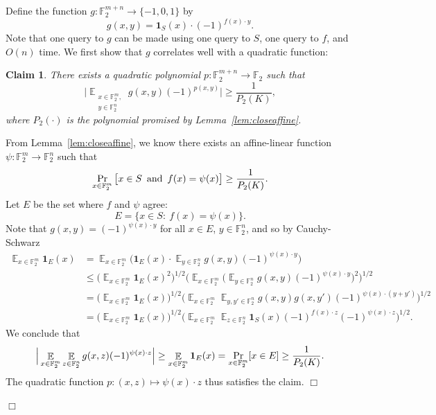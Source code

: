 \documentclass[11pt]{amsart}
\renewcommand{\Pr}{\mathop{\mbox{\rm Pr}}}
\newcommand{\Exp}{\mathop{\mathbb{E}}}
\newcommand{\F}{\mathbb{F}} %
\newcommand{\one}{\mathbf{1}}
\theoremstyle{plain}
\newtheorem{claim}[theorem]{Claim}
\theoremstyle{definition}
\theoremstyle{remark}
\renewenvironment{proof}[1][]{
    	\begin{trivlist}
     	\item[\hspace{\labelsep}{\em\noindent Proof#1:\/}]}
     	{{\hfill$\Box$}
    	\end{trivlist}
  }
\begin{document}
\begin{proof}
Define the function $g: \F_2^{m+n} \to \{-1, 0, 1\}$ by
$$g(x, y) = \one_S(x)\cdot (-1)^{f(x)\cdot y}.$$
Note that one query to $g$ can be made using one query to $S$, one query to $f$, and $O(n)$ time.
We first show that $g$ correlates well with a quadratic function:

\begin{claim}
\label{claim:highu3}
    There exists a quadratic polynomial $p: \F_2^{m+n} \to \F_2$ such that
    $$\Big|\Exp_{\substack{x\in \F_2^m,\\ y\in \F_2^n}} g(x,y) (-1)^{p(x,y)}\Big| \geq \frac{1}{P_2(K)},$$
    where $P_2(\cdot)$ is the polynomial promised by Lemma~\ref{lem:closeaffine}.
\end{claim}

\begin{proof}
From Lemma~\ref{lem:closeaffine}, we know there exists an affine-linear function $\psi: \F_2^m \to \F_2^n$ such that
$$\Pr_{x\in \F_2^m} \big[x\in S \,\text{ and }\, f(x) = \psi(x)\big] \geq \frac{1}{P_2(K)}.$$
Let $E$ be the set where $f$ and $\psi$ agree:
$$E = \big\{x\in S:\: f(x) = \psi(x)\big\}.$$
Note that $g(x, y) = (-1)^{\psi(x)\cdot y}$ for all $x\in E$, $y\in \F_2^n$, and so by Cauchy-Schwarz
\begin{align*}
    \Exp_{x\in \F_2^m} \one_E(x)
    &= \Exp_{x\in \F_2^m} \Big(\one_E(x) \cdot \Exp_{y\in \F_2^n} g(x,y) (-1)^{\psi(x)\cdot y}\Big) \\
    &\leq \Big(\Exp_{x\in \F_2^m} \one_E(x)^2 \Big)^{1/2} \Big(\Exp_{x\in \F_2^m}\Big(\Exp_{y\in \F_2^n} g(x,y) (-1)^{\psi(x)\cdot y}\Big)^2\Big)^{1/2} \\
    &= \Big(\Exp_{x\in \F_2^m} \one_E(x) \Big)^{1/2} \Big(\Exp_{x\in \F_2^m} \Exp_{y, y'\in \F_2^n} g(x,y) g(x,y') (-1)^{\psi(x)\cdot (y+y')}\Big)^{1/2} \\
    &= \Big(\Exp_{x\in \F_2^m} \one_E(x) \Big)^{1/2} \Big(\Exp_{x\in \F_2^m} \Exp_{z\in \F_2^n} \one_S(x) (-1)^{f(x) \cdot z} (-1)^{\psi(x)\cdot z}\Big)^{1/2}.
\end{align*}
We conclude that
$$\Big|\Exp_{x\in \F_2^m} \Exp_{z\in \F_2^n} g(x,z) (-1)^{\psi(x)\cdot z}\Big| \geq \Exp_{x\in \F_2^m} \one_E(x) = \Pr_{x\in \F_2^m}[x\in E] \geq \frac{1}{P_2(K)}.$$
The quadratic function $p: (x,z) \mapsto \psi(x)\cdot z$ thus satisfies the claim.
\end{proof}


\end{proof}
\end{document}
